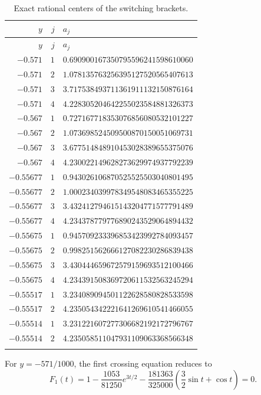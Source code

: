 \documentclass[11pt,a4paper]{article}
\begin{document}
{\small
\begin{longtable}{@{}rrl@{}}
\caption{Exact rational centers of the switching brackets.}\label{tab:events}\\
\toprule $y$ & $j$ & $a_j$\\\midrule\endfirsthead
\toprule $y$ & $j$ & $a_j$\\\midrule\endhead
$-0.571$ & $1$ & $0.690900167350795596241598610060$\\
$-0.571$ & $2$ & $1.078135763256395127520565407613$\\
$-0.571$ & $3$ & $3.717538493711361911132150876164$\\
$-0.571$ & $4$ & $4.228305204642255023584881326373$\\
\addlinespace[2pt]
$-0.567$ & $1$ & $0.727167718353076856080532101227$\\
$-0.567$ & $2$ & $1.073698524509500870150051069731$\\
$-0.567$ & $3$ & $3.677514848910453028389655375076$\\
$-0.567$ & $4$ & $4.230022149628273629974937792239$\\
\addlinespace[2pt]
$-0.55677$ & $1$ & $0.943026106870525525503040801495$\\
$-0.55677$ & $2$ & $1.000234039978349548083465355225$\\
$-0.55677$ & $3$ & $3.432412794615143204771577791489$\\
$-0.55677$ & $4$ & $4.234378779776890243529064894432$\\
\addlinespace[2pt]
$-0.55675$ & $1$ & $0.945709233396853423992784093457$\\
$-0.55675$ & $2$ & $0.998251562666127082230286839438$\\
$-0.55675$ & $3$ & $3.430444659672579159693512100466$\\
$-0.55675$ & $4$ & $4.234391508369720611532563245294$\\
\addlinespace[2pt]
$-0.55517$ & $1$ & $3.234089094501122628580828533598$\\
$-0.55517$ & $2$ & $4.235054342221641269610541466055$\\
\addlinespace[2pt]
$-0.55514$ & $1$ & $3.231221607277306682192172796767$\\
$-0.55514$ & $2$ & $4.235058511047931109063368566348$\\
\addlinespace[2pt]
\bottomrule
\end{longtable}}
For $y=-571/1000$, the first
crossing equation reduces to
\[
 F_1(t)=1-\frac{1053}{81250}e^{3t/2}
 -\frac{181363}{325000}\left(\frac32\sin t+\cos t\right)=0.
\]
\end{document}
